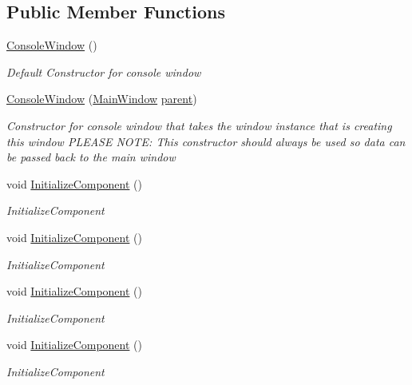\subsection*{Public Member Functions}
\begin{DoxyCompactItemize}
\item 
\hyperlink{class_c_p_u___o_s___simulator_1_1_console_window_abdd222b591f72c19297dc5805059ee7e}{Console\+Window} ()
\begin{DoxyCompactList}\small\item\em Default Constructor for console window \end{DoxyCompactList}\item 
\hyperlink{class_c_p_u___o_s___simulator_1_1_console_window_a4e79b8ceea62fb4bb44c63b7fdd7c6bb}{Console\+Window} (\hyperlink{class_c_p_u___o_s___simulator_1_1_main_window}{Main\+Window} \hyperlink{class_c_p_u___o_s___simulator_1_1_console_window_a1e38326bb40f4ed44c4964d94dc6f809}{parent})
\begin{DoxyCompactList}\small\item\em Constructor for console window that takes the window instance that is creating this window P\+L\+E\+A\+S\+E N\+O\+T\+E\+: This constructor should always be used so data can be passed back to the main window \end{DoxyCompactList}\item 
void \hyperlink{class_c_p_u___o_s___simulator_1_1_console_window_a5961ed9b274d16fab841f34bc178b52f}{Initialize\+Component} ()
\begin{DoxyCompactList}\small\item\em Initialize\+Component \end{DoxyCompactList}\item 
void \hyperlink{class_c_p_u___o_s___simulator_1_1_console_window_a5961ed9b274d16fab841f34bc178b52f}{Initialize\+Component} ()
\begin{DoxyCompactList}\small\item\em Initialize\+Component \end{DoxyCompactList}\item 
void \hyperlink{class_c_p_u___o_s___simulator_1_1_console_window_a5961ed9b274d16fab841f34bc178b52f}{Initialize\+Component} ()
\begin{DoxyCompactList}\small\item\em Initialize\+Component \end{DoxyCompactList}\item 
void \hyperlink{class_c_p_u___o_s___simulator_1_1_console_window_a5961ed9b274d16fab841f34bc178b52f}{Initialize\+Component} ()
\begin{DoxyCompactList}\small\item\em Initialize\+Component \end{DoxyCompactList}\end{DoxyCompactItemize}
